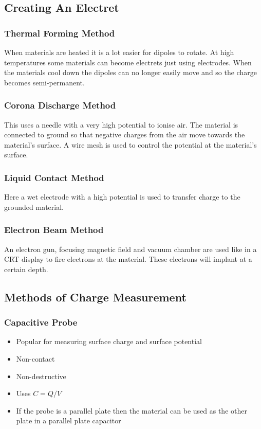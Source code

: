 \documentclass[11pt,a4paper]{report}
\begin{document}
\subsection{Creating An Electret}
\subsubsection{Thermal Forming Method}
When materials are heated it is a lot easier for dipoles to rotate. At high temperatures some materials can become electrets just using electrodes. When the materials cool down the dipoles can no longer easily move and so the charge becomes semi-permanent. 

\subsubsection{Corona Discharge Method}
This uses a needle with a very high potential to ionise air. The material is connected to ground so that negative charges from the air move towards the material's surface. A wire mesh is used to control the potential at the material's surface. 

\subsubsection{Liquid Contact Method}
Here a wet electrode with a high potential is used to transfer charge to the grounded material.

\subsubsection{Electron Beam Method}
An electron gun, focusing magnetic field and vacuum chamber are used like in a CRT display to fire electrons at the material. These electrons will implant at a certain depth. 

\subsection{Methods of Charge Measurement}
\subsubsection{Capacitive Probe}
\begin{itemize}
	\item Popular for measuring surface charge and surface potential
	\item Non-contact
	\item Non-destructive
	\item Uses $C = Q/V$
	\item If the probe is a parallel plate then the material can be used as the other plate in a parallel plate capacitor
\end{itemize}
\end{document}
